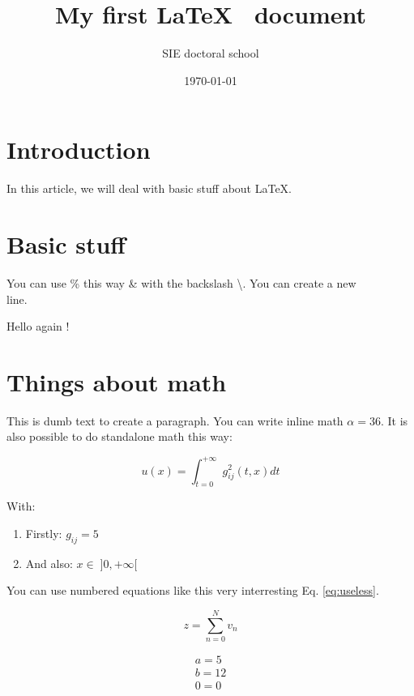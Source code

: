 \documentclass[10pt,a4paper]{article}
\title{My first \LaTeX~ document}
\author{SIE doctoral school}
\date{\today}
\begin{document}
\maketitle %

\section{Introduction}

In this article, we will  deal with basic stuff about \LaTeX.

\tableofcontents



\section{Basic stuff}

You can use \% this way \& with the backslash \textbackslash.
You can create a new \\ line.

\vspace{2cm}

Hello again !

\section{Things about math}

This is dumb text to create a paragraph.
You can write inline math $\alpha = 36$.
\blindtext[1]
It is also possible  to do standalone math this way:

$$
    u(x) = \int_{t=0}^{+\infty} g_{ij}^2(t,x) dt
$$

\noindent With: %

\begin{enumerate}
    \item Firstly: $g_{ij} = 5$
    \item And also: $x \in \; ] 0, +\infty [$ %
\end{enumerate}

\noindent You can use numbered equations like this very interresting Eq. \ref{eq:useless}.

\begin{equation}
    z = \sum_{n=0}^N v_n
    \label{eq:useless} %
\end{equation}

\begin{eqnarray}
    a =  5 \nonumber \\ %
    b = 12 \\
    0 = 0
\end{eqnarray}
\end{document}
